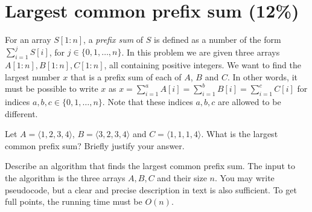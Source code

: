 



\section{Largest common prefix sum (12\%)}

For an array $S[1\!:\!n]$, a \emph{prefix sum} of $S$ is defined as a number of the form $\sum_{i=1}^jS[i]$, for $j\in\{0,1,\ldots,n\}$.
In this problem we are given three arrays $A[1\!:\!n],B[1\!:\!n],C[1\!:\!n]$, all containing positive integers.
We want to find the largest number $x$ that is a prefix sum of each of $A$, $B$ and $C$.
In other words, it must be possible to write $x$ as $x=\sum_{i=1}^aA[i]=\sum_{i=1}^bB[i]=\sum_{i=1}^cC[i]$ for indices $a,b,c\in\{0,1,\ldots,n\}$.
Note that these indices $a,b,c$ are allowed to be different.

{Let $A=\langle 1,2,3,4\rangle$, $B=\langle 3,2,3,4\rangle$ and $C=\langle 1,1,1,4\rangle$.
What is the largest common prefix sum? Briefly justify your answer.}


{Describe an algorithm that finds the largest common prefix sum.
The input to the algorithm is the three arrays $A,B,C$ and their size $n$.
You may write pseudocode, but a clear and precise description in text is also sufficient.
To get full points, the running time must be $O(n)$.}

